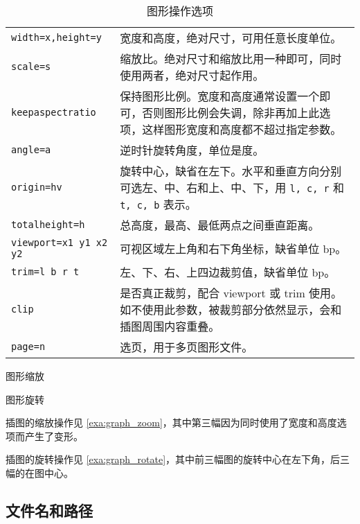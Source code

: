 \begin{table}[htbp]
\caption{图形操作选项}
\label{tab:graph_options}
\centering
\begin{tabularx}{\textwidth}{lX}
  \toprule
  \texttt{width=x,height=y} & 宽度和高度，绝对尺寸，可用任意长度单位。\\
  \texttt{scale=s} & 缩放比。绝对尺寸和缩放比用一种即可，同时使用两者，绝对尺寸起作用。\\
  \texttt{keepaspectratio} & 保持图形比例。宽度和高度通常设置一个即可，否则图形比例会失调，除非再加上此选项，这样图形宽度和高度都不超过指定参数。\\
  \texttt{angle=a} & 逆时针旋转角度，单位是度。\\
  \texttt{origin=hv} & 旋转中心，缺省在左下。水平和垂直方向分别可选左、中、右和上、中、下，用 \texttt{l, c, r} 和 \texttt{t, c, b} 表示。\\
  \texttt{totalheight=h} & 总高度，最高、最低两点之间垂直距离。\\
  \texttt{viewport=x1 y1 x2 y2} & 可视区域左上角和右下角坐标，缺省单位 bp。\\
  \texttt{trim=l b r t} & 左、下、右、上四边裁剪值，缺省单位 bp。\\
  \texttt{clip} & 是否真正裁剪，配合 viewport 或 trim 使用。如不使用此参数，被裁剪部分依然显示，会和插图周围内容重叠。\\
  \texttt{page=n} & 选页，用于多页图形文件。\\
  \bottomrule
\end{tabularx}
\end{table}

\begin{example}[htbp]
\caption{图形缩放}
\label{exa:graph_zoom}
\end{example}

\begin{example}[htbp]
\caption{图形旋转}
\label{exa:graph_rotate}
\end{example}

插图的缩放操作见 \autoref{exa:graph_zoom}，其中第三幅因为同时使用了宽度和高度选项而产生了变形。

插图的旋转操作见 \autoref{exa:graph_rotate}，其中前三幅图的旋转中心在左下角，后三幅的在图中心。

\subsection{文件名和路径}

